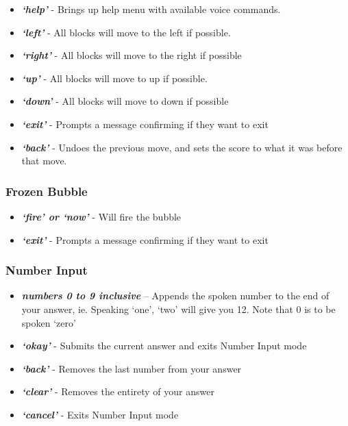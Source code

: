 \documentclass[11pt, oneside]{article}
\begin{document}
\begin{itemize}
  	\item {\em\bf`help'} - Brings up help menu with available voice commands. 
	\item {\em\bf`left'} - All blocks will move to the left if possible. 
	\item {\em\bf`right'} - All blocks will move to the right if possible
	\item {\em\bf`up'} - All blocks will move to up if possible. 
	\item {\em\bf`down'} - All blocks will move to down if possible
	\item {\em\bf`exit'} - Prompts a message confirming if they want to exit
	\item {\em\bf`back'} - Undoes the previous move, and sets the score to what it was before that move.
	
\end{itemize}

\subsubsection{Frozen Bubble}

\begin{itemize}
	\item {\em\bf`fire' or `now'} - Will fire the bubble
	\item {\em\bf`exit'} - Prompts a message confirming if they want to exit
	
\end{itemize}

\pagebreak

\subsubsection{Number Input}
\begin{itemize}
  \item {\em\bf numbers 0 to 9 inclusive} – Appends the spoken number
    to the end of your answer, ie. Speaking `one', `two' will give you
    12. Note that 0 is to be spoken `zero'
  \item {\em\bf `okay'} - Submits the current answer and exits Number
    Input mode
  \item {\em\bf `back'} - Removes the last number from your answer
  \item {\em\bf `clear'} - Removes the entirety of your answer
  \item {\em\bf `cancel'} - Exits Number Input mode
\end{itemize}
\end{document}
